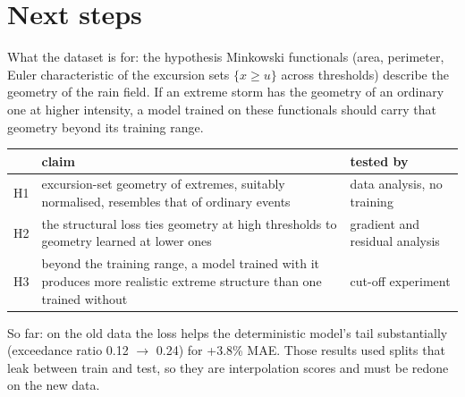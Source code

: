 \documentclass[aspectratio=169,10pt]{beamer}
\begin{document}
\section{Next steps}

\begin{frame}{What the dataset is for: the hypothesis}
  \small
  Minkowski functionals (area, perimeter, Euler characteristic of the excursion sets
  $\{x \ge u\}$ across thresholds) describe the geometry of the rain field. If an extreme storm
  has the geometry of an ordinary one at higher intensity, a model trained on these functionals
  should carry that geometry beyond its training range.
  \vspace{2mm}

  \centering
  \begin{tabular}{lp{7.2cm}l}
    \toprule
    & claim & tested by \\
    \midrule
    H1 & excursion-set geometry of extremes, suitably normalised, resembles that of ordinary events
       & data analysis, no training \\
    H2 & the structural loss ties geometry at high thresholds to geometry learned at lower ones
       & gradient and residual analysis \\
    H3 & beyond the training range, a model trained with it produces more realistic extreme
       structure than one trained without & cut-off experiment \\
    \bottomrule
  \end{tabular}
  \vspace{2mm}

  \raggedright
  So far: on the old data the loss helps the deterministic model's tail substantially
  (exceedance ratio 0.12 $\to$ 0.24) for +3.8\% MAE. Those results used splits that leak
  between train and test, so they are interpolation scores and must be redone on the new data.
\end{frame}
\end{document}
